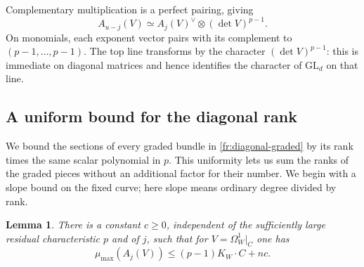 \documentclass[12pt,a4paper,psamsfonts]{amsart}
\theoremstyle{definition}
\theoremstyle{plain}
\newtheorem{lemma}{Lemma}[section]
\begin{document}
Complementary multiplication is a perfect pairing, giving
\begin{equation}\label{fr:socle-pairing}
 A_{u-j}(V)\simeq A_j(V)^\vee\otimes(\det V)^{p-1}.
\end{equation}
On monomials, each exponent vector pairs with its complement to
$(p-1,\ldots,p-1)$.  The top line transforms by the character
$(\det V)^{p-1}$: this is immediate on diagonal matrices and hence
 identifies the character of $\mathrm{GL}_d$ on that line.

\subsection{A uniform bound for the diagonal rank}
\label{fr:rank-bound}

We bound the sections of every graded bundle in
\eqref{fr:diagonal-graded} by its rank times the same scalar
polynomial in $p$. This uniformity lets us sum the ranks of the
graded pieces without an additional factor for their number.
We begin with a slope bound on the fixed curve; here slope means
ordinary degree divided by rank.

\begin{lemma}\label{fr:truncated-slope}
There is a constant $c\ge0$, independent of the sufficiently large
residual characteristic $p$ and of $j$, such that for
$V=\Omega_W^1|_C$ one has
\[
 \mu_{\max}(A_j(V))\le(p-1)K_W\cdot C+nc.
\]
\end{lemma}
\end{document}
